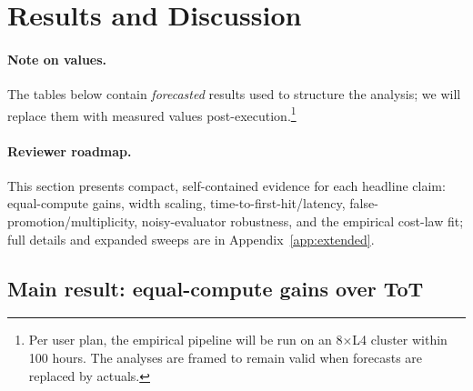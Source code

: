 \documentclass{article}
\begin{document}
\section{Results and Discussion}
\label{section:results}

\paragraph{Note on values.}
The tables below contain \emph{forecasted} results used to structure the analysis; we will replace them with measured values post-execution.\footnote{Per user plan, the empirical pipeline will be run on an 8$\times$L4 cluster within 100 hours. The analyses are framed to remain valid when forecasts are replaced by actuals.}
\paragraph{Reviewer roadmap.} This section presents compact, self-contained evidence for each headline claim: equal-compute gains, width scaling, time-to-first-hit/latency, false-promotion/multiplicity, noisy-evaluator robustness, and the empirical cost-law fit; full details and expanded sweeps are in Appendix~\ref{app:extended}.

\label{section:results}


\subsection{Main result: equal-compute gains over ToT}
\label{subsec:main-result}
\end{document}
